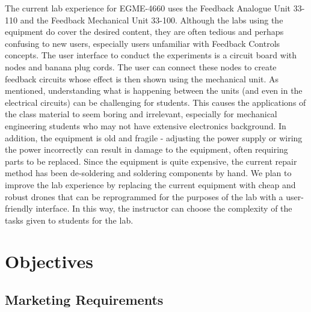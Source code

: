 \documentclass[12pt, titlepage]{article}
\begin{document}
The current lab experience for EGME-4660 uses the Feedback Analogue Unit 33-110 and the Feedback Mechanical Unit 33-100. Although the labs using the equipment do cover the desired content, they are often tedious and perhaps confusing to new users, especially users unfamiliar with Feedback Controls concepts. The user interface to conduct the experiments is a circuit board with nodes and banana plug cords. The user can connect these nodes to create feedback circuits whose effect is then shown using the mechanical unit. As mentioned, understanding what is happening between the units (and even in the electrical circuits) can be challenging for students. This causes the applications of the class material to  seem boring and irrelevant, especially for mechanical engineering students who may not have extensive electronics background. In addition, the equipment is old and fragile - adjusting the power supply or wiring the power incorrectly can result in damage to the equipment, often requiring parts to be replaced. Since the equipment is quite expensive, the current repair method has been de-soldering and soldering components by hand. We plan to improve the lab experience by replacing the current equipment with cheap and robust drones that can be reprogrammed for the purposes of the lab with a user-friendly interface. In this way, the instructor can choose the complexity of the tasks given to students for the lab.

\section{Objectives}
\subsection{Marketing Requirements}
\end{document}
